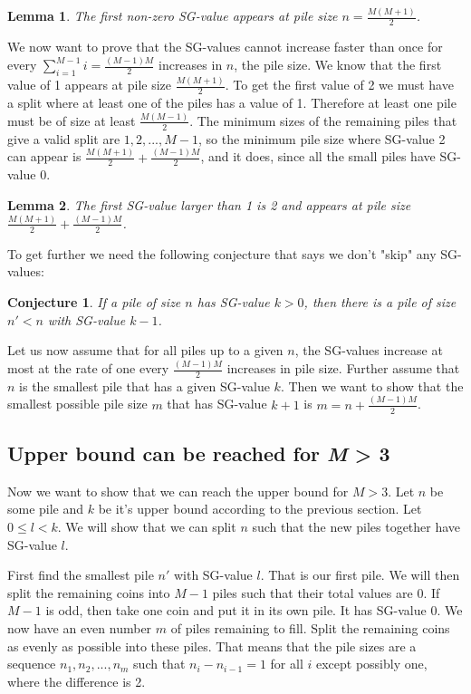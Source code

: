 \documentclass[english,a4paper,twoside]{amsart}
\theoremstyle{lemma}
\newtheorem{conj}{Conjecture}
\newtheorem{lemma}{Lemma}
\begin{document}
\begin{lemma}
    The first non-zero SG-value appears at pile size $n = \frac{M(M+1)}{2}$.
\end{lemma}

We now want to prove that the SG-values cannot increase faster than once for every
$\sum_{i=1}^{M-1} i = \frac{(M-1)M}{2}$ increases in $n$, the pile size. We know that the first value
of 1 appears at pile size $\frac{M(M+1)}{2}$. To get the first value of 2 we must have a split where
at least one of the piles
has a value of 1. Therefore at least one pile must be of size at least $\frac{M(M-1)}{2}$. The minimum sizes of
the remaining piles that give a valid split are $1, 2, ..., M-1$, so the minimum pile size where SG-value 2
can appear is $\frac{M(M+1)}{2} + \frac{(M-1)M}{2}$, and it does, since all the small piles
have SG-value 0.

\begin{lemma}
    The first SG-value larger than 1 is 2 and appears at pile size $\frac{M(M+1)}{2} + \frac{(M-1)M}{2}$.
\end{lemma}

To get further we need the following conjecture that says we don't "skip" any SG-values:

\begin{conj}
\label{conj:noskip}
    If a pile of size $n$ has SG-value $k > 0$, then there is a pile of size $n' < n$ with
    SG-value $k-1$.
\end{conj}

Let us now assume that for all piles up to a given $n$, the SG-values increase at most at the rate
of one every $\frac{(M-1)M}{2}$ increases in pile size. Further assume that $n$ is the smallest pile
that has a given SG-value $k$. Then we want to show that the smallest possible pile size $m$ that has
SG-value $k+1$ is $m = n+\frac{(M-1)M}{2}$.

\subsection{Upper bound can be reached for \emph{M} > 3}
Now we want to show that we can reach the upper bound for $M > 3$. Let $n$ be some pile and $k$ be
it's upper bound according to the previous section. Let $0 \leq l < k$. We will show that we can
split $n$ such that the new piles together have SG-value $l$.

First find the smallest pile $n'$ with SG-value $l$. That is our first pile. We will then split the
remaining coins into $M-1$ piles such that their total values are 0. If $M-1$ is odd, then take
one coin and put it in its own pile. It has SG-value 0. We now have an even number $m$ of piles remaining
to fill. Split the remaining coins as evenly as possible into these piles. That means that the
pile sizes are a sequence $n_1, n_2, ..., n_m$ such that $n_i - n_{i-1} = 1$ for all $i$ except
possibly one, where the difference is 2.
\end{document}
